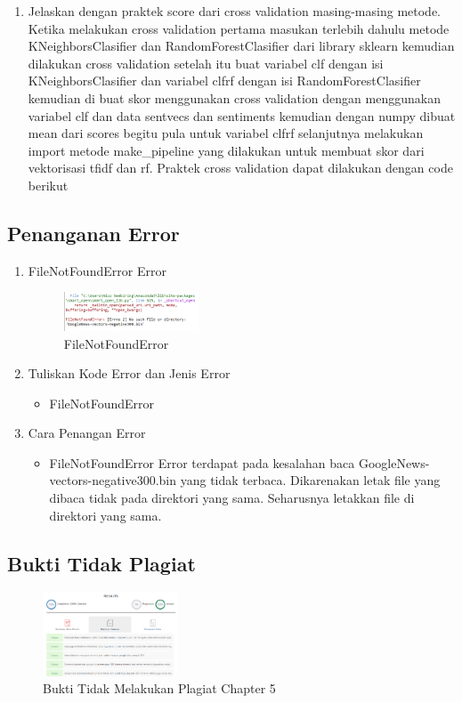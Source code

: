 \begin{enumerate}
    \item Jelaskan dengan praktek score dari cross validation masing-masing metode. 
    Ketika melakukan cross validation pertama masukan terlebih dahulu metode KNeighborsClasifier dan RandomForestClasifier dari library sklearn kemudian dilakukan cross validation setelah itu buat variabel clf dengan isi KNeighborsClasifier dan variabel clfrf dengan isi RandomForestClasifier kemudian di buat skor menggunakan cross validation dengan menggunakan variabel clf dan data sentvecs dan sentiments kemudian dengan numpy dibuat mean dari scores begitu pula untuk variabel clfrf selanjutnya melakukan import metode make\_pipeline yang dilakukan untuk membuat skor dari vektorisasi tfidf dan rf.
    \hfill\break
    Praktek cross validation dapat dilakukan dengan code berikut
    
\end{enumerate}
    
\subsection{Penanganan Error}
\begin{enumerate}
	\item FileNotFoundError Error
	\begin{figure}[H]
		\includegraphics[width=4cm]{figures/1174096/tugas5/error.PNG}
		\centering
		\caption{FileNotFoundError}
	\end{figure}
	\item Tuliskan Kode Error dan Jenis Error
	\begin{itemize}
		\item FileNotFoundError
	\end{itemize}
	\item Cara Penangan Error
	\begin{itemize}
		\item FileNotFoundError
		\hfill\break
		Error terdapat pada kesalahan baca GoogleNews-vectors-negative300.bin yang tidak terbaca. Dikarenakan letak file yang dibaca tidak pada direktori yang sama. Seharusnya letakkan file di direktori yang sama. 
	\end{itemize}
\end{enumerate}
\subsection{Bukti Tidak Plagiat}
\begin{figure}[H]
\centering
	\includegraphics[width=4cm]{figures/1174096/tugas5/plagiarisme.PNG}
	\caption{Bukti Tidak Melakukan Plagiat Chapter 5}
\end{figure}
